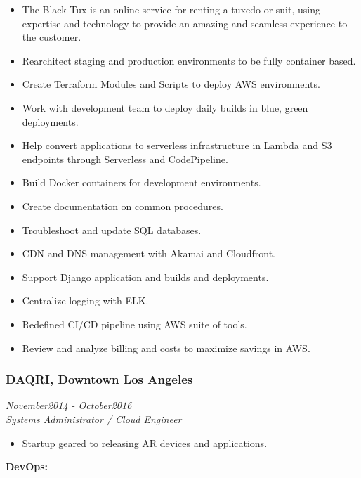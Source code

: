 \documentclass[]{article}
\providecommand{\tightlist}{%
  \setlength{\itemsep}{0pt}\setlength{\parskip}{0pt}}
\begin{document}
\begin{itemize}
\item
  The Black Tux is an online service for renting a tuxedo or suit, using
  expertise and technology to provide an amazing and seamless experience
  to the customer.
\item
  Rearchitect staging and production environments to be fully container
  based.
\item
  Create Terraform Modules and Scripts to deploy AWS environments.
\item
  Work with development team to deploy daily builds in blue, green
  deployments.
\item
  Help convert applications to serverless infrastructure in Lambda and
  S3 endpoints through Serverless and CodePipeline.
\item
  Build Docker containers for development environments.
\item
  Create documentation on common procedures.
\item
  Troubleshoot and update SQL databases.
\item
  CDN and DNS management with Akamai and Cloudfront.
\item
  Support Django application and builds and deployments.
\item
  Centralize logging with ELK.
\item
  Redefined CI/CD pipeline using AWS suite of tools.
\item
  Review and analyze billing and costs to maximize savings in AWS.
\end{itemize}

\hypertarget{daqri-downtown-los-angeles}{%
\subsubsection{DAQRI, Downtown Los
Angeles}\label{daqri-downtown-los-angeles}}

\emph{November2014 - October2016}\\
\emph{Systems Administrator / Cloud Engineer}

\begin{itemize}
\tightlist
\item
  Startup geared to releasing AR devices and applications.
\end{itemize}

\textbf{DevOps:}
\end{document}
